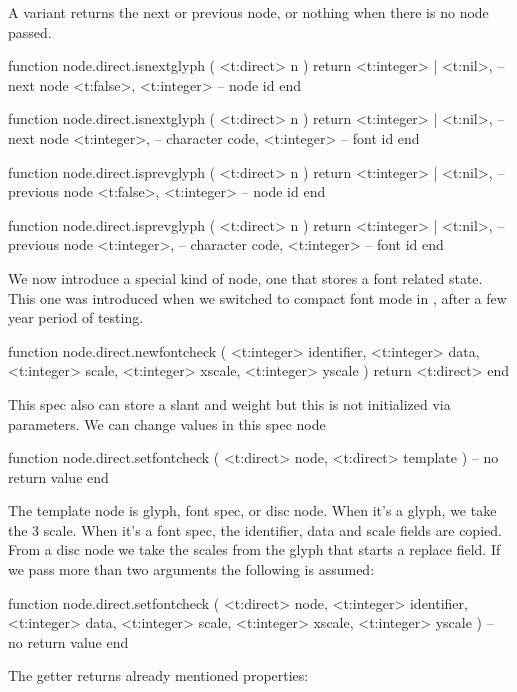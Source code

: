 A variant returns the next or previous node, or nothing when there is no node
passed.

\starttyping[option=LUA]
function node.direct.isnextglyph ( <t:direct> n )
    return
        <t:integer> | <t:nil>, -- next node
        <t:false>,
        <t:integer>            -- node id
end

function node.direct.isnextglyph ( <t:direct> n )
    return
        <t:integer> | <t:nil>, -- next node
        <t:integer>,           -- character code,
        <t:integer>            -- font id
end

function node.direct.isprevglyph ( <t:direct> n )
    return
        <t:integer> | <t:nil>, -- previous node
        <t:false>,
        <t:integer>            -- node id
end

function node.direct.isprevglyph ( <t:direct> n )
    return
        <t:integer> | <t:nil>, -- previous node
        <t:integer>,           -- character code,
        <t:integer>            -- font id
end
\stoptyping

We now introduce a special kind of node, one that stores a font related state. This
one was introduced when we switched to compact font mode in \CONTEXT, after a
few year period of testing.

\starttyping[option=LUA]
function node.direct.newfontcheck (
    <t:integer> identifier,
    <t:integer> data,
    <t:integer> scale,
    <t:integer> xscale,
    <t:integer> yscale
)
    return <t:direct>
end
\stoptyping

This spec also can store a slant and weight but this is not initialized
via parameters. We can change values in this spec node

\starttyping[option=LUA]
function node.direct.setfontcheck (
    <t:direct> node,
    <t:direct> template
)
    -- no return value
end
\stoptyping

The template node is glyph, font spec, or disc node. When it's a glyph, we take
the 3 scale. When it's a font spec, the identifier, data and scale fields are
copied. From a disc node we take the scales from the glyph that starts a replace
field. If we pass more than two arguments the following is assumed:

\starttyping[option=LUA]
function node.direct.setfontcheck (
    <t:direct>  node,
    <t:integer> identifier,
    <t:integer> data,
    <t:integer> scale,
    <t:integer> xscale,
    <t:integer> yscale
)
    -- no return value
end
\stoptyping

The getter returns already mentioned properties:

